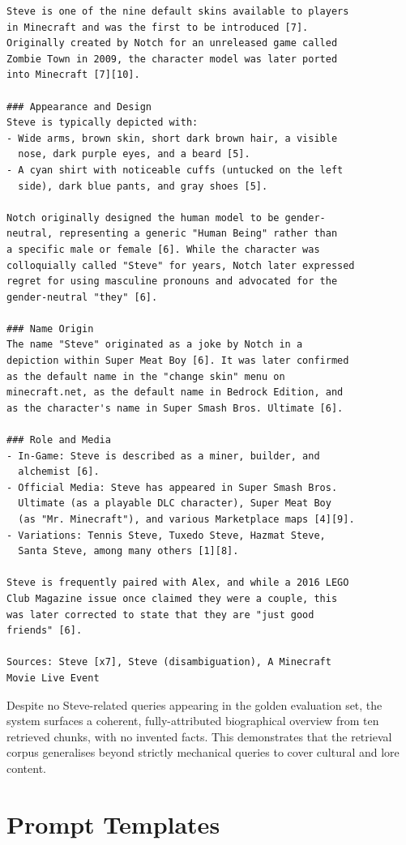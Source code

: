 \documentclass[11pt,a4paper]{article}
\begin{document}
\begin{lstlisting}
Steve is one of the nine default skins available to players
in Minecraft and was the first to be introduced [7].
Originally created by Notch for an unreleased game called
Zombie Town in 2009, the character model was later ported
into Minecraft [7][10].

### Appearance and Design
Steve is typically depicted with:
- Wide arms, brown skin, short dark brown hair, a visible
  nose, dark purple eyes, and a beard [5].
- A cyan shirt with noticeable cuffs (untucked on the left
  side), dark blue pants, and gray shoes [5].

Notch originally designed the human model to be gender-
neutral, representing a generic "Human Being" rather than
a specific male or female [6]. While the character was
colloquially called "Steve" for years, Notch later expressed
regret for using masculine pronouns and advocated for the
gender-neutral "they" [6].

### Name Origin
The name "Steve" originated as a joke by Notch in a
depiction within Super Meat Boy [6]. It was later confirmed
as the default name in the "change skin" menu on
minecraft.net, as the default name in Bedrock Edition, and
as the character's name in Super Smash Bros. Ultimate [6].

### Role and Media
- In-Game: Steve is described as a miner, builder, and
  alchemist [6].
- Official Media: Steve has appeared in Super Smash Bros.
  Ultimate (as a playable DLC character), Super Meat Boy
  (as "Mr. Minecraft"), and various Marketplace maps [4][9].
- Variations: Tennis Steve, Tuxedo Steve, Hazmat Steve,
  Santa Steve, among many others [1][8].

Steve is frequently paired with Alex, and while a 2016 LEGO
Club Magazine issue once claimed they were a couple, this
was later corrected to state that they are "just good
friends" [6].

Sources: Steve [x7], Steve (disambiguation), A Minecraft
Movie Live Event
\end{lstlisting}

\noindent Despite no Steve-related queries appearing in the golden evaluation set, the system surfaces a coherent, fully-attributed biographical overview from ten retrieved chunks, with no invented facts. This demonstrates that the retrieval corpus generalises beyond strictly mechanical queries to cover cultural and lore content.

\section{Prompt Templates}
\label{app:prompts}
\end{document}
